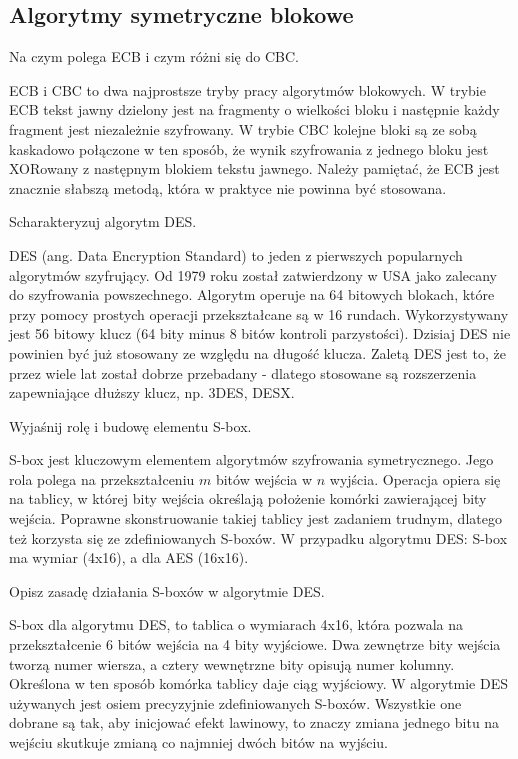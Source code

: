 \documentclass[answers,11pt]{exam}
\begin{document}
\subsection{Algorytmy symetryczne blokowe}
\begin{questions}

\question Na czym polega ECB i czym różni się do CBC.
\begin{solution}
ECB i CBC to dwa najprostsze tryby pracy algorytmów blokowych. W trybie ECB tekst jawny dzielony jest na fragmenty o wielkości bloku i następnie każdy fragment jest niezależnie szyfrowany. W trybie CBC kolejne bloki są ze sobą kaskadowo połączone w ten sposób, że wynik szyfrowania z jednego bloku jest XORowany z następnym blokiem tekstu jawnego. Należy pamiętać, że ECB jest znacznie słabszą metodą, która w praktyce nie powinna być stosowana.
\end{solution}

\question Scharakteryzuj algorytm DES.
\begin{solution}
DES (ang. Data Encryption Standard) to jeden z pierwszych popularnych algorytmów szyfrujący. Od 1979 roku został zatwierdzony w USA jako zalecany do szyfrowania powszechnego. Algorytm operuje na 64 bitowych blokach, które przy pomocy prostych operacji przekształcane są w 16 rundach. Wykorzystywany jest 56 bitowy klucz (64 bity minus 8 bitów kontroli parzystości). Dzisiaj DES nie powinien być już stosowany ze względu na długość klucza. Zaletą DES jest to, że przez wiele lat został dobrze przebadany - dlatego stosowane są rozszerzenia zapewniające dłuższy klucz, np. 3DES, DESX.
\end{solution}

\question Wyjaśnij rolę i budowę elementu S-box.
\begin{solution}
S-box jest kluczowym elementem algorytmów szyfrowania symetrycznego. Jego rola polega na przekształceniu $m$ bitów wejścia w $n$ wyjścia. Operacja opiera się na tablicy, w której bity wejścia określają położenie komórki zawierającej bity wejścia. Poprawne skonstruowanie takiej tablicy jest zadaniem trudnym, dlatego też korzysta się ze zdefiniowanych S-boxów. W przypadku algorytmu DES: S-box ma wymiar (4x16), a dla AES (16x16). 
\end{solution}

\question Opisz zasadę działania S-boxów w algorytmie DES.
\begin{solution}
S-box dla algorytmu DES, to tablica o wymiarach 4x16, która pozwala na przekształcenie 6 bitów wejścia na 4 bity wyjściowe. Dwa zewnętrze bity wejścia tworzą numer wiersza, a cztery wewnętrzne bity opisują numer kolumny. Określona w ten sposób komórka tablicy daje ciąg wyjściowy. W algorytmie DES używanych jest osiem precyzyjnie zdefiniowanych S-boxów. Wszystkie one dobrane są tak, aby inicjować efekt lawinowy, to znaczy zmiana jednego bitu na wejściu skutkuje zmianą co najmniej dwóch bitów na wyjściu.
\end{solution}


\end{questions}
\end{document}
